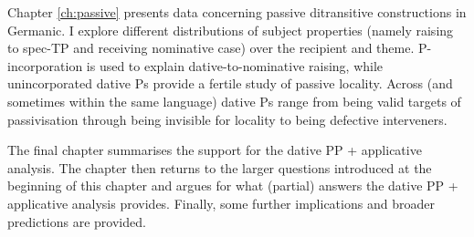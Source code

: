 Chapter \ref{ch:passive} presents data concerning passive ditransitive constructions in Germanic. I explore different distributions of subject properties (namely raising to spec-TP and receiving nominative case) over the recipient and theme. P-incorporation is used to explain dative-to-nominative raising, while unincorporated dative Ps provide a fertile study of passive locality. Across (and sometimes within the same language) dative Ps range from being valid targets of passivisation through being invisible for locality to being defective interveners.

The final chapter summarises the support for the dative PP + applicative analysis. The chapter then returns to the larger questions introduced at the beginning of this chapter and argues for what (partial) answers the dative PP + applicative analysis provides. Finally, some further implications and broader predictions are provided. 
%
